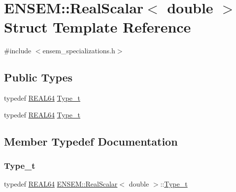 \hypertarget{structENSEM_1_1RealScalar_3_01double_01_4}{}\section{E\+N\+S\+EM\+:\+:Real\+Scalar$<$ double $>$ Struct Template Reference}
\label{structENSEM_1_1RealScalar_3_01double_01_4}


{\ttfamily \#include $<$ensem\+\_\+specializations.\+h$>$}

\subsection*{Public Types}
\begin{DoxyCompactItemize}
\item 
typedef \mbox{\hyperlink{namespaceENSEM_a85b215b9f1f43715aebee01718e25082}{R\+E\+A\+L64}} \mbox{\hyperlink{structENSEM_1_1RealScalar_3_01double_01_4_a15549d5ed238882861151026df8e74b3}{Type\+\_\+t}}
\item 
typedef \mbox{\hyperlink{namespaceENSEM_a85b215b9f1f43715aebee01718e25082}{R\+E\+A\+L64}} \mbox{\hyperlink{structENSEM_1_1RealScalar_3_01double_01_4_a15549d5ed238882861151026df8e74b3}{Type\+\_\+t}}
\end{DoxyCompactItemize}


\subsection{Member Typedef Documentation}
\mbox{\label{structENSEM_1_1RealScalar_3_01double_01_4_a15549d5ed238882861151026df8e74b3}} 
\subsubsection{\texorpdfstring{Type\_t}{Type\_t}\hspace{0.1cm}{\footnotesize\ttfamily [1/2]}}
{\footnotesize\ttfamily typedef \mbox{\hyperlink{namespaceENSEM_a85b215b9f1f43715aebee01718e25082}{R\+E\+A\+L64}} \mbox{\hyperlink{structENSEM_1_1RealScalar}{E\+N\+S\+E\+M\+::\+Real\+Scalar}}$<$ double $>$\+::\mbox{\hyperlink{structENSEM_1_1RealScalar_3_01double_01_4_a15549d5ed238882861151026df8e74b3}{Type\+\_\+t}}}


